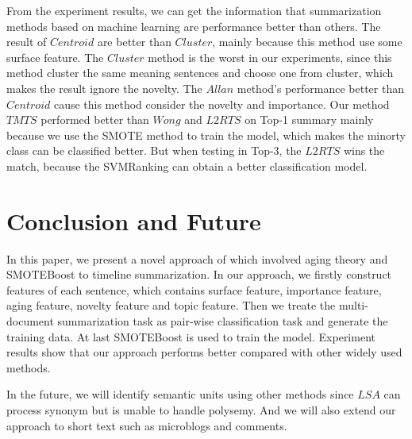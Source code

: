 \documentclass{acm_proc_article-sp}
\begin{document}
From the experiment results, we can get the information that summarization methods based on machine learning are performance better than others. The result of $Centroid$ are better than $Cluster$, mainly because this method use some surface feature. The $Cluster$ method is the worst in our experiments, since this method cluster the same meaning sentences and choose one from cluster, which makes the result ignore the novelty. The $Allan$ method's performance better than $Centroid$ cause this method consider the novelty and importance. Our method $TMTS$ performed better than $Wong$ and $L2RTS$ on Top-1 summary mainly because we use the SMOTE method to train the model, which makes the minorty class can be classified better. But when testing in Top-3, the $L2RTS$ wins the match, because the SVMRanking can obtain a better classification model.

%
\section{Conclusion and Future}
%

In this paper, we present a novel approach of which involved aging theory and SMOTEBoost to timeline summarization. In our approach, we firstly construct features of each sentence, which contains surface feature, importance feature, aging feature, novelty feature and topic feature. Then we treate the multi-document summarization task as pair-wise classification task and generate the training data. At last SMOTEBoost is used to train the model. Experiment results show that our approach performs better compared with other widely used methods.

In the future, we will identify semantic units using other methods since $LSA$ can process synonym but is unable to handle polysemy. And we will also extend our approach to short text such as microblogs and comments.






\end{document}
